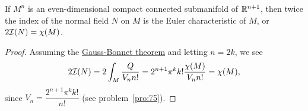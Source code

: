 \documentclass[../main]{subfiles}
\begin{document}
\begin{theorem} \label{thm:ch8.3.2}
    If $M^n$ is an even-dimensional compact connected submanifold of $\mathbb{R}^{n+1}$, then twice the index of the normal field $N$ on $M$ is the Euler characteristic of $M$, or $2\mathcal{I}(N)=\chi(M)$.
\end{theorem}

\begin{proof}
    Assuming the \hyperref[thm:ch8.1.5]{Gauss-Bonnet theorem} and letting $n = 2k$, we see
    \[ 2\mathcal{I}(N) = 2\int_M \frac{Q}{V_n n!} = 2^{n+1} \pi^k k! \frac{\chi(M)}{V_n n!} = \chi(M)\text{,} \]
    since $V_n = \dfrac{2^{n+1} \pi^k k!}{n!}$ (see problem~\ref{pro:75}).
\end{proof}
\end{document}
